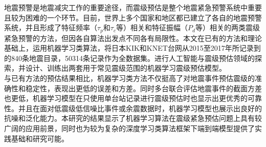 
\begin{cabstract}
\indent 地震预警是地震减灾工作的重要途径，而震级预估是整个地震紧急预警系统中重要且较为困难的一个环节。目前，世界上多个国家和地区都已建立了各自的地震预警系统，并且形成了特征频率（$\tau_{p}$和$\tau_{c}$等）相关和特征振幅（$P_{d}$等）相关的两类震级紧急预警的方法，但因各自算法出发点不同各有局限性。本文在已有的方法和理论基础上，运用机器学习类算法，将日本KIK和KNET台网从2015至2017年所记录到的840条地震目录，50314条记录作为全数据集。进行人工智能与震级预估领域的探索，并设计、训练出两套用于常见震级范围的机器学习震级预估模型。\\
\indent 与已有方法的预估结果相比，机器学习类方法不仅挺高了对地震事件预估震级的准确性和稳定性，表现出更低的误差和方差。同时多台联合评估地震事件的截面方差也更低，机器学习模型在只使用单台站记录进行震级预估时也显示出更优秀的可靠性。并且在面对低震级低信噪比事件或余震数据时，机器学习模型也展示出良好的抗噪和泛化能力。本研究的结果显示了机器学习算法在震级紧急预估问题上具有较广阔的应用前景，同时也为较为复杂的深度学习类算法框架下端到端模型提供了实践基础和研究可能。\\
\end{cabstract}

